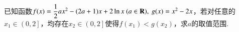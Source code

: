 \begin{questions}
\kb 
\qs 已知函数$f(x)=\dfrac{1}{2}ax^2-(2a+1)x+2\ln x~(a\in\mathbf{R}),~g(x)=x^2-2x$，若对任意的$ x_1\in\left(0,2\right] $，均存在$ x_2\in\left(0,2\right] $使得$ f(x_1)<g(x_2) $，求$ a $的取值范围.





\end{questions}
